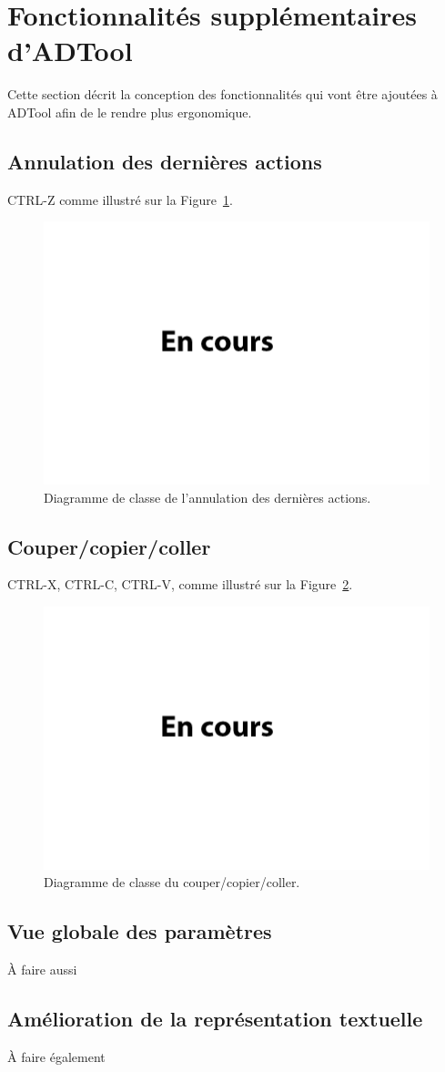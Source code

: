 \section{Fonctionnalités supplémentaires d'ADTool}
    \label{sec:ADTool}
    Cette section décrit la conception des fonctionnalités qui vont être ajoutées à ADTool afin de le rendre plus ergonomique.
    
    \subsection{Annulation des dernières actions}
    	CTRL-Z comme illustré sur la {\sc Figure}~{\ref{fig:ctrlz}}.
    	
    	\begin{figure}[H]
	        \centering
	        \includegraphics[height=0.3\textwidth]{figure/ctrlz.png}
	        \caption{Diagramme de classe de l'annulation des dernières actions.}
	        \label{fig:ctrlz}
	    \end{figure}
    
    \subsection{Couper/copier/coller}
		CTRL-X, CTRL-C, CTRL-V, comme illustré sur la {\sc Figure}~{\ref{fig:copiercoller}}.
    	
    	\begin{figure}[H]
	        \centering
	        \includegraphics[height=0.3\textwidth]{figure/copiercoller.png}
	        \caption{Diagramme de classe du couper/copier/coller.}
	        \label{fig:copiercoller}
	    \end{figure}
	    
	\subsection{Vue globale des paramètres}
		À faire aussi
	
	\subsection{Amélioration de la représentation textuelle}
		À faire également
	  
